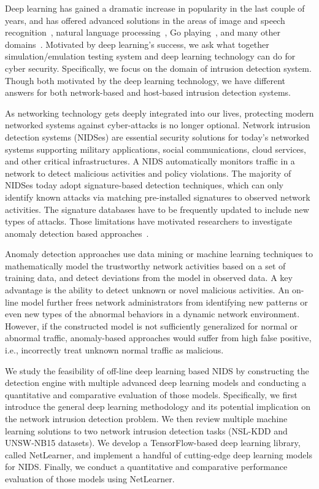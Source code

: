 \label{DL:Sec:Intro}

Deep learning has gained a dramatic increase in popularity in the last couple of years,
and has offered advanced solutions in the areas of image and speech recognition~\cite{AlexNet, SpeechDNN},
natural language processing~\cite{Word2Vec}, Go playing~\cite{AlphaGo}, and many other domains~\cite{DeepLearning}. 
Motivated by deep learning's success, we ask what together simulation/emulation testing system and deep learning technology can do for cyber security.
Specifically, we focus on the domain of intrusion detection system.
Though both motivated by the deep learning technology, we have different answers for both network-based and host-based intrusion detection systems.


\label{DL:SubSec:NIDS}
As networking technology gets deeply integrated into our lives, protecting modern networked systems against cyber-attacks is no longer optional.
Network intrusion detection systems (NIDSes) are essential security solutions for today's networked systems supporting military applications,
social communications, cloud services, and other critical infrastructures.
A NIDS automatically monitors traffic in a network to detect malicious activities and policy violations.
The majority of NIDSes today adopt signature-based detection techniques,
which can only identify known attacks via matching pre-installed signatures to observed network activities. 
The signature databases have to be frequently updated to include new types of attacks.
Those limitations have motivated researchers to investigate anomaly detection based approaches~\cite{STL-NIDS, LOF, RankingOutliner, NB-Tree, RampLossKSVCR, GAA-ADS}. 

Anomaly detection approaches use data mining or machine learning techniques to mathematically model the trustworthy network activities based on a set of training data,
and detect deviations from the model in observed data. A key advantage is the ability to detect unknown or novel malicious activities.
An on-line model further frees network administrators from identifying new patterns or even new types of the abnormal behaviors in a dynamic network environment.
However, if the constructed model is not sufficiently generalized for normal or abnormal traffic,
anomaly-based approaches would suffer from high false positive, i.e., incorrectly treat unknown normal traffic as malicious.

We study the feasibility of off-line deep learning based NIDS by constructing the detection engine with
multiple advanced deep learning models and conducting a quantitative and comparative evaluation of those models.
Specifically, we first introduce the general deep learning methodology and its potential implication on the network intrusion detection problem.
We then review multiple machine learning solutions to two network intrusion detection tasks (NSL-KDD and UNSW-NB15 datasets).
We develop a TensorFlow-based deep learning library, called NetLearner, and implement a handful of cutting-edge deep learning models for NIDS.
Finally, we conduct a quantitative and comparative performance evaluation of those models using NetLearner.

